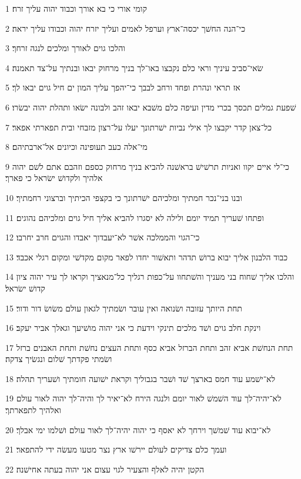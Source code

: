 \par 1 קומי אורי כי בא אורך וכבוד יהוה עליך זרח׃
\par 2 כי־הנה החשׁך יכסה־ארץ וערפל לאמים ועליך יזרח יהוה וכבודו עליך יראה׃
\par 3 והלכו גוים לאורך ומלכים לנגה זרחך׃
\par 4 שׂאי־סביב עיניך וראי כלם נקבצו באו־לך בניך מרחוק יבאו ובנתיך על־צד תאמנה׃
\par 5 אז תראי ונהרת ופחד ורחב לבבך כי־יהפך עליך המון ים חיל גוים יבאו לך׃
\par 6 שׁפעת גמלים תכסך בכרי מדין ועיפה כלם משׁבא יבאו זהב ולבונה ישׂאו ותהלת יהוה יבשׂרו׃
\par 7 כל־צאן קדר יקבצו לך אילי נביות ישׁרתונך יעלו על־רצון מזבחי ובית תפארתי אפאר׃
\par 8 מי־אלה כעב תעופינה וכיונים אל־ארבתיהם׃
\par 9 כי־לי איים יקוו ואניות תרשׁישׁ בראשׁנה להביא בניך מרחוק כספם וזהבם אתם לשׁם יהוה אלהיך ולקדושׁ ישׂראל כי פארך׃
\par 10 ובנו בני־נכר חמתיך ומלכיהם ישׁרתונך כי בקצפי הכיתיך וברצוני רחמתיך׃
\par 11 ופתחו שׁעריך תמיד יומם ולילה לא יסגרו להביא אליך חיל גוים ומלכיהם נהוגים׃
\par 12 כי־הגוי והממלכה אשׁר לא־יעבדוך יאבדו והגוים חרב יחרבו׃
\par 13 כבוד הלבנון אליך יבוא ברושׁ תדהר ותאשׁור יחדו לפאר מקום מקדשׁי ומקום רגלי אכבד׃
\par 14 והלכו אליך שׁחוח בני מעניך והשׁתחוו על־כפות רגליך כל־מנאציך וקראו לך עיר יהוה ציון קדושׁ ישׂראל׃
\par 15 תחת היותך עזובה ושׂנואה ואין עובר ושׂמתיך לגאון עולם משׂושׂ דור ודור׃
\par 16 וינקת חלב גוים ושׁד מלכים תינקי וידעת כי אני יהוה מושׁיעך וגאלך אביר יעקב׃
\par 17 תחת הנחשׁת אביא זהב ותחת הברזל אביא כסף ותחת העצים נחשׁת ותחת האבנים ברזל ושׂמתי פקדתך שׁלום ונגשׂיך צדקה׃
\par 18 לא־ישׁמע עוד חמס בארצך שׁד ושׁבר בגבוליך וקראת ישׁועה חומתיך ושׁעריך תהלה׃
\par 19 לא־יהיה־לך עוד השׁמשׁ לאור יומם ולנגה הירח לא־יאיר לך והיה־לך יהוה לאור עולם ואלהיך לתפארתך׃
\par 20 לא־יבוא עוד שׁמשׁך וירחך לא יאסף כי יהוה יהיה־לך לאור עולם ושׁלמו ימי אבלך׃
\par 21 ועמך כלם צדיקים לעולם יירשׁו ארץ נצר מטעו מעשׂה ידי להתפאר׃
\par 22 הקטן יהיה לאלף והצעיר לגוי עצום אני יהוה בעתה אחישׁנה׃

